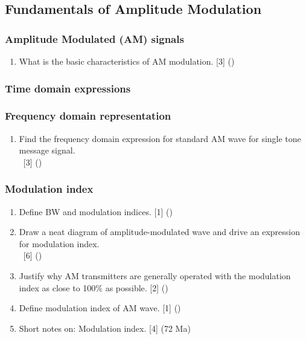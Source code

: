 \documentclass[12pt]{article}
\newcommand{\enter}{\\\textcolor{white}{1}}
\begin{document}
  \subsection{Fundamentals of Amplitude Modulation}
    \subsubsection{Amplitude Modulated (AM) signals}
      \begin{enumerate}
        \item What is the basic characteristics of AM modulation. \hfill [3] ()
      \end{enumerate}

    \subsubsection{Time domain expressions}
    \subsubsection{Frequency domain representation}
      \begin{enumerate}
        \item Find the frequency domain expression for standard AM wave for single tone message signal.
        \enter\hfill [3] ()
      \end{enumerate}

    \subsubsection{Modulation index}
      \begin{enumerate}
        \item Define BW and modulation indices. \hfill [1] ()

        \item Draw a neat diagram of amplitude-modulated wave and drive an expression for modulation index.
        \enter\hfill [6] ()

        \item Justify why AM transmitters are generally operated with the modulation index as close to 100\% as possible. \hfill [2] ()

        \item Define modulation index of AM wave. \hfill [1] ()

        \item Short notes on: Modulation index. \hfill [4] (72 Ma)
      \end{enumerate}
\end{document}
